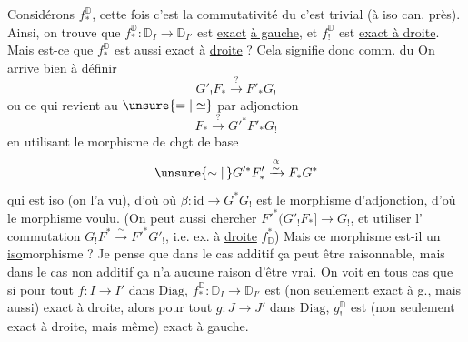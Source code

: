 Considérons $f_*^{\mathbb D}$, cette fois c'est la commutativité du
c'est trivial  (à iso can. près). Ainsi, on
trouve que $f^{\mathbb D}_*:\mathbb D_I\longrightarrow\mathbb D_{I'}$ est \uline{exact} \uline{à gauche}, et  $f^{\mathbb D}_!$ est \uline{exact à droite}. Mais est-ce que $f^{\mathbb D}_*$ est aussi exact à \uline{droite} ? Cela signifie donc comm. du
On arrive bien à définir
\[
G'_!F_*\xrightarrow{?}F'_*G_!
\]
ou ce qui revient au $\unsure{=|\simeq}$ par adjonction
\[
F_*\xrightarrow{?}G'^*F'_*G_!
\]
en utilisant le morphisme de chgt de base
\[
\unsure{\sim|\,}G'^*F'_*\xrightarrow{\substack{\alpha\\\sim}}F_*G^*
\]
qui est \uline{iso} (on l'a vu), d'où
où $\beta:\mathrm{id}\longrightarrow G^*G_!$ \unsure{)} est le morphisme d'adjonction, d'où le morphisme voulu. (On peut aussi chercher $F'^*(G'_!F_*]\longrightarrow G_!$, et utiliser l' commutation $G_!F^*\xrightarrow{\sim}F'^*G'_!$, i.e. ex. à \uline{droite}   $f^*_{\mathbb D}$)
Mais ce morphisme est-il un \uline{iso}morphisme ? Je pense que dans le cas additif ça peut être raisonnable, mais dans le cas non additif ça n'a aucune raison d'être vrai. On voit en tous cas que si pour tout $f:I\longrightarrow I'$ dans $\mathrm{Diag}$, $f_*^{\mathbb D}:\mathbb D_I\longrightarrow\mathbb D_{I'}$ est (non seulement exact à g., mais aussi) exact à droite, alors pour tout $g:J\longrightarrow J'$ dans $\mathrm{Diag}$, $g_!^{\mathbb D}$ est (non seulement exact à droite, mais même) exact à gauche.

